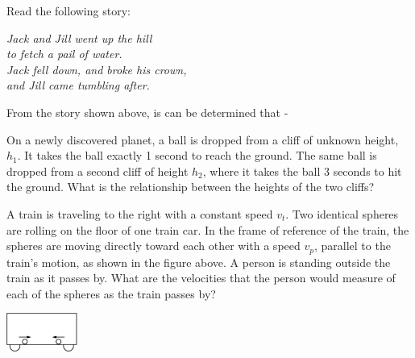\documentclass[10pt]{examdesign}
\begin{document}
\begin{multiplechoice} [title={Multiple Choice},
	rearrange=yes]
\begin{question}
	Read the following story:
\begin{center}
	\textit{Jack and Jill went up the hill \\
		to fetch a pail of water.\\
		Jack fell down, and broke his crown,\\
		and Jill came tumbling after.}
\end{center}

From the story shown above, is can be determined that - 
	\end{question}


\begin{question}
	On a newly discovered planet, a ball is dropped from a cliff of unknown height, $h_1$.  It takes the ball exactly 1 second to reach the ground.  The same ball is dropped from a second cliff of height $h_2$, where it takes the ball 3 seconds to hit the ground.  What is the relationship between the heights of the two cliffs?  
\end{question}

\begin{question}
	A train is traveling to the right with a constant speed $v_t$.  Two identical spheres are rolling on the floor of one train car.  In the frame of reference of the train, the spheres are moving directly toward each other with a speed $v_p$, parallel to the train's motion, as shown in the figure above.  A person is standing outside the train as it passes by.  What are the velocities that the person would measure of each of the spheres as the train passes by? 
	
	\begin{center}
		\includegraphics[height=0.5in]{train2.png}  
	\end{center}
	
	
	
	

\end{question}
\end{multiplechoice}
\end{document}

